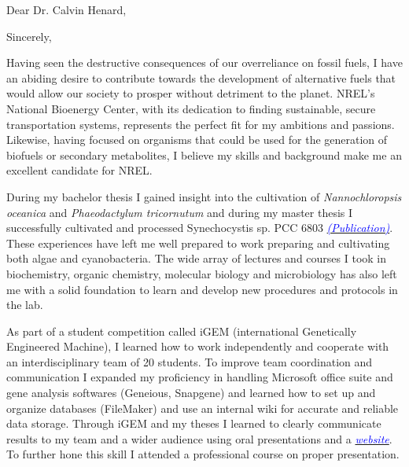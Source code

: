 \documentclass[11pt,a4paper,sans]{moderncv}
\begin{document}
\date{\today}
\opening{Dear Dr. Calvin Henard,}
\closing{Sincerely,}
\makelettertitle
\begin{spacing}{1.15}

Having seen the destructive consequences of our overreliance on fossil fuels, I have an abiding desire to contribute towards the development of alternative fuels that would allow our society to prosper without detriment to the planet. NREL's National Bioenergy Center, with its dedication to finding sustainable, secure transportation systems, represents the perfect fit for my ambitions and passions. Likewise, having focused on organisms that could be used for the generation of biofuels or secondary metabolites, I believe my skills and background make me an excellent candidate for NREL.\par\vspace*{1mm}

During my bachelor thesis I gained insight into the cultivation of \textit{Nannochloropsis oceanica} and \textit{Phaeodactylum tricornutum} and during my master thesis I successfully cultivated and processed Synechocystis sp. PCC 6803 {\href{https://www.ncbi.nlm.nih.gov/pubmed/29517395}{\textcolor{blue}{{\textit{(Publication)}}}}}. These experiences have left me well prepared to work preparing and cultivating both algae and cyanobacteria. The wide array of lectures and courses I took in biochemistry, organic chemistry, molecular biology and microbiology has also left me with a solid foundation to learn and develop new procedures and protocols in the lab.\par\vspace*{1mm}

As part of a student competition called iGEM (international Genetically Engineered Machine), I learned how to work independently and cooperate with an interdisciplinary team of 20 students. To improve team coordination and communication I expanded my proficiency in handling Microsoft office suite and gene analysis softwares (Geneious, Snapgene) and learned how to set up and organize databases (FileMaker) and use an internal wiki for accurate and reliable data storage. Through iGEM and my theses I learned to clearly communicate results to my team and a wider audience using oral presentations and a {\href{http://2015.igem.org/Team:Freiburg}{\textcolor{blue}{\textit{website}}}}. To further hone this skill I attended a professional course on proper presentation.\par\vspace*{1mm}


\end{spacing}
\end{document}
